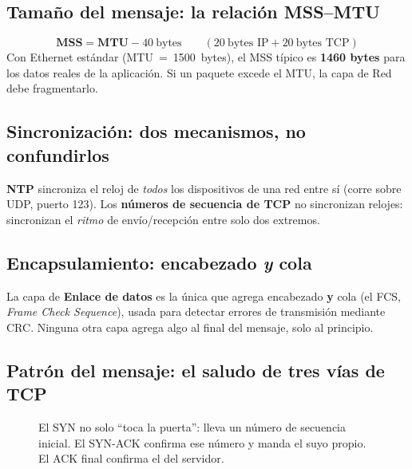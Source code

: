 \documentclass[11pt,a4paper]{article}
\begin{document}
\subsection*{Tamaño del mensaje: la relación MSS--MTU}
\[
\textbf{MSS} = \textbf{MTU} - 40\ \text{bytes} \qquad (20\ \text{bytes IP} + 20\ \text{bytes TCP})
\]
Con Ethernet estándar (MTU~=~1500~bytes), el MSS típico es \textbf{1460 bytes} para los datos reales de la aplicación. Si un paquete excede el MTU, la capa de Red debe fragmentarlo.

\subsection*{Sincronización: dos mecanismos, no confundirlos}
\textbf{NTP} sincroniza el reloj de \emph{todos} los dispositivos de una red entre sí (corre sobre UDP, puerto 123). Los \textbf{números de secuencia de TCP} no sincronizan relojes: sincronizan el \emph{ritmo} de envío/recepción entre solo dos extremos.

\subsection*{Encapsulamiento: encabezado \emph{y} cola}
\begin{examfact}
La capa de \textbf{Enlace de datos} es la única que agrega encabezado \textbf{y} cola (el FCS, \textit{Frame Check Sequence}), usada para detectar errores de transmisión mediante CRC. Ninguna otra capa agrega algo al final del mensaje, solo al principio.
\end{examfact}

\subsection*{Patrón del mensaje: el saludo de tres vías de TCP}
\begin{figure}[h]
\centering
{}
\caption{El SYN no solo ``toca la puerta'': lleva un número de secuencia inicial. El SYN-ACK confirma ese número y manda el suyo propio. El ACK final confirma el del servidor.}
\end{figure}
\end{document}
